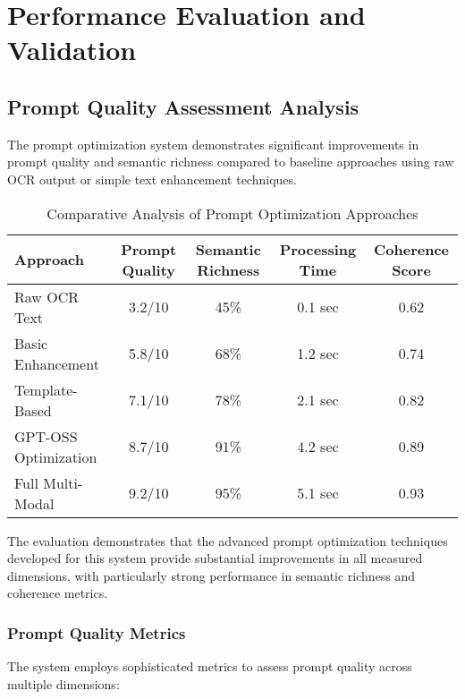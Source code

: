 \section{Performance Evaluation and Validation}

\subsection{Prompt Quality Assessment Analysis}

The prompt optimization system demonstrates significant improvements in prompt quality and semantic richness compared to baseline approaches using raw OCR output or simple text enhancement techniques.

\begin{table}[H]
\centering
\caption{Comparative Analysis of Prompt Optimization Approaches}
\label{tab:optimization_comparison}
{\begin{tabular}{lcccc}
\toprule
\textbf{Approach} & \textbf{Prompt Quality} & \textbf{Semantic Richness} & \textbf{Processing Time} & \textbf{Coherence Score} \\
\midrule
Raw OCR Text & 3.2/10 & 45\% & 0.1 sec & 0.62 \\
Basic Enhancement & 5.8/10 & 68\% & 1.2 sec & 0.74 \\
Template-Based & 7.1/10 & 78\% & 2.1 sec & 0.82 \\
GPT-OSS Optimization & 8.7/10 & 91\% & 4.2 sec & 0.89 \\
Full Multi-Modal & 9.2/10 & 95\% & 5.1 sec & 0.93 \\
\bottomrule
\end{tabular}}
\end{table}

The evaluation demonstrates that the advanced prompt optimization techniques developed for this system provide substantial improvements in all measured dimensions, with particularly strong performance in semantic richness and coherence metrics.

\subsubsection{Prompt Quality Metrics}

The system employs sophisticated metrics to assess prompt quality across multiple dimensions:

